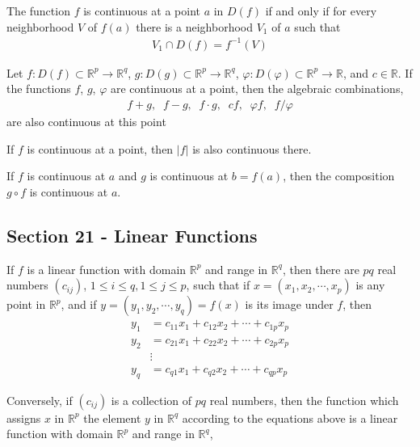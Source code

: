 \documentclass[12pt]{article}
\newcommand{\R}{\mathbb{R}}
\newenvironment{theorem}[2][Theorem]{\begin{trivlist}
\item[\hskip \labelsep {\bfseries #1}\hskip \labelsep {\bfseries #2.}]}{\end{trivlist}}
\begin{document}
\begin{theorem}{20.4}
The function $f$ is continuous at a point $a$ in $D(f)$ if and only if for every neighborhood $V$ of $f(a)$ there is a neighborhood $V_1$ of $a$ such that
\begin{align*}
V_1 \cap D(f) = f^{-1}(V)
\end{align*}
\end{theorem}

\begin{theorem}{20.6}
Let $f: D(f) \subset \R^p \to \R^q$, $g: D(g) \subset \R^p \to \R^q$, $\varphi: D(\varphi) \subset \R^p \to \R$, and $c \in \R$. If the functions $f$, $g$, $\varphi$ are continuous at a point, then the algebraic combinations,
\begin{align*}
f+g, \; \; f-g, \; \; f \cdot g, \; \; cf, \; \; \varphi f, \; \; f/\varphi
\end{align*}
are also continuous at this point
\end{theorem}

\begin{theorem}{20.7}
If $f$ is continuous at a point, then $|f|$ is also continuous there.
\end{theorem}

\begin{theorem}{20.8}
If $f$ is continuous at $a$ and $g$ is continuous at $b = f(a)$, then the composition $g \circ f$ is continuous at $a$.
\end{theorem}

\subsection*{Section 21 - Linear Functions}

\begin{theorem}{21.2}
If $f$ is a linear function with domain $\R^p$ and range in $\R^q$, then there are $pq$ real numbers $(c_{ij})$, $1 \leq i \leq q, 1 \leq j \leq p$, such that if $x = (x_1, x_2, \cdots, x_p)$ is any point in $\R^p$, and if $y = (y_1, y_2, \cdots, y_q) = f(x)$ is its image under $f$, then
\begin{align*}
y_1 &= c_{11}x_1 + c_{12}x_2 + \cdots + c_{1p}x_p\\
y_2 &= c_{21}x_1 + c_{22}x_2 + \cdots + c_{2p}x_p\\
&\vdots\\
y_q &= c_{q1}x_1 + c_{q2}x_2 + \cdots + c_{qp}x_p
\end{align*}

Conversely, if $(c_{ij})$ is a collection of $pq$ real numbers, then the function which assigns $x$ in $\R^p$ the element $y$ in $\R^q$ according to the equations above is a linear function with domain $\R^p$ and range in $\R^q$,
\end{theorem}
\end{document}
